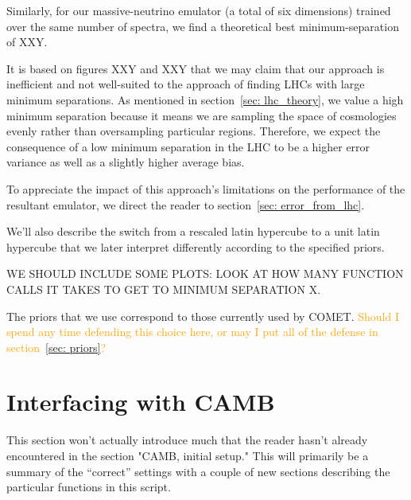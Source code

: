 Similarly, for our massive-neutrino emulator (a total of six dimensions)
trained over the same number of spectra, we find a theoretical best
minimum-separation of XXY. 

It is based on figures XXY and XXY that we may claim that our approach is
inefficient and not well-suited to the approach of finding LHCs with large
minimum separations. As mentioned in section~\ref{sec: lhc_theory},
we value a high minimum separation because it means we are sampling the
space of cosmologies evenly rather than oversampling particular regions.
Therefore, we expect the consequence of a low minimum separation in the LHC to
be a higher error variance as well as a slightly higher average bias.


To appreciate the impact of this approach's limitations on the performance of
the resultant emulator, we direct the reader to
section~\ref{sec: error_from_lhc}.



We'll also describe the switch from a rescaled latin hypercube to a unit latin hypercube that we later interpret differently according to the specified priors.

WE SHOULD INCLUDE SOME PLOTS: LOOK AT HOW MANY FUNCTION CALLS IT TAKES TO GET
TO MINIMUM SEPARATION X.


The priors that we use correspond to those currently used by COMET. \textcolor{orange}{Should I spend any time defending this choice here, or may I put all of the defense in section~\ref{sec: priors}?}

\section{Interfacing with CAMB}


This section won't actually introduce much that the reader hasn't already encountered in the section "CAMB, initial setup." This will primarily be a summary of the ``correct'' settings with a couple of new sections describing the particular functions in this script.

